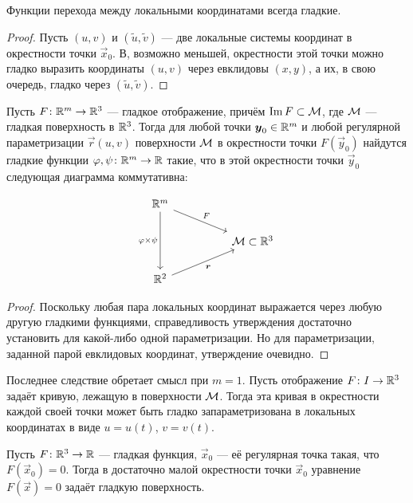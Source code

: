 \begin{corollary} \label{corollary:SmoothLocal}
	Функции перехода между локальными координатами всегда гладкие.
\end{corollary}

\begin{proof}
	Пусть $(u, v)$ и $(\widetilde{u}, \widetilde{v})$ --- две локальные системы координат в окрестности точки $\vec{x}_0$. В, возможно меньшей, окрестности этой точки можно гладко выразить координаты $(u, v)$ через евклидовы $(x, y)$, а их, в свою очередь, гладко через $(\widetilde{u}, \widetilde{v})$.
\end{proof}

\begin{corollary}
	Пусть $F\colon \mathbb{R}^m \to \mathbb{R}^3$ --- гладкое отображение, причём $\operatorname{Im} F \subset \mathcal{M}$, где $\mathcal{M}$ --- гладкая поверхность в $\mathbb{R}^3$. Тогда для любой точки $\boldsymbol{y}_0 \in \mathbb{R}^m$ и любой регулярной параметризации $\vec{r}(u, v)$ поверхности $\mathcal{M}$ в окрестности точки $F(\vec{y}_0)$ найдутся гладкие функции $\varphi, \psi\colon \mathbb{R}^m \to \mathbb{R}$ такие, что в этой окрестности точки $\vec{y}_0$ следующая диаграмма коммутативна:

	\[\begin{tikzcd}
		{\R^m} \\
		&& {\mathcal{M} \subset\R^3} \\
		{\R^2}
		\arrow["F", from=1-1, to=2-3]
		\arrow["{\varphi \times \psi}"', from=1-1, to=3-1]
		\arrow["{\boldsymbol{r}}"', from=3-1, to=2-3]
	\end{tikzcd}\]
\end{corollary}

\begin{proof}
	Поскольку любая пара локальных координат выражается через любую другую гладкими функциями, справедливость утверждения достаточно установить для какой-либо одной параметризации. Но для параметризации, заданной парой евклидовых координат, утверждение очевидно.
\end{proof}

Последнее следствие обретает смысл при $m = 1$. Пусть отображение $F\colon I \to \mathbb{R}^3$ задаёт кривую, лежащую в поверхности $\mathcal{M}$. Тогда эта кривая в окрестности каждой своей точки может быть гладко запараметризована в локальных координатах в виде $u = u(t)$, $v = v(t)$.

\begin{proposition}
	Пусть $F\colon \mathbb{R}^3 \to \mathbb{R}$ --- гладкая функция, $\vec{x}_0$ --- её регулярная точка такая, что $F(\vec{x}_0) = 0$. Тогда в достаточно малой окрестности точки $\vec{x}_0$ уравнение $F(\vec{x}) = 0$ задаёт гладкую поверхность.
\end{proposition}

